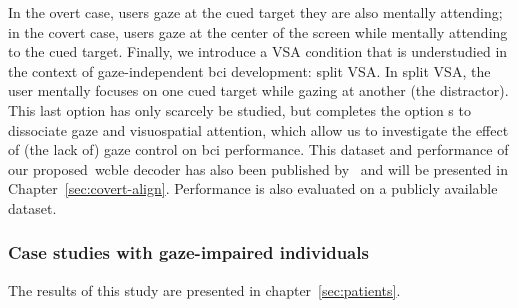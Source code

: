 In the overt case, users gaze at the cued
target they are also mentally attending; in the covert case, users
gaze at the center of the screen while mentally attending to the cued target.
Finally, we introduce a VSA condition that is understudied in the context of
gaze-independent \ac{bci} development: split VSA.
In split VSA, the user mentally focuses on one cued target while gazing at
another (the distractor).
This last option has only scarcely be studied, but completes
the option s to dissociate gaze and visuospatial attention, which allow us to
investigate the effect of (the lack of) gaze control on \ac{bci} performance.
This dataset and performance of our proposed~\ac{wcble} decoder has also been
published by~\textcite{VanDenKerchove2024} and will be presented in
Chapter~\ref{sec:covert-align}.
Performance is also evaluated on a publicly available dataset.

\subsubsection{Case studies with gaze-impaired individuals}
The results of this study are presented in chapter~\ref{sec:patients}.
